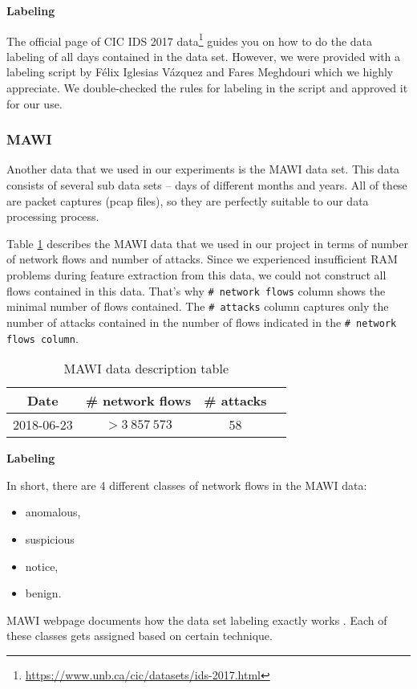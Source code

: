 \documentclass{article}
\begin{document}
\clearpage
\noindent\textbf{Labeling}

The official page of CIC IDS 2017 data\footnote{\url{https://www.unb.ca/cic/datasets/ids-2017.html}} guides you on how to do the data labeling of all days contained in the data set. However, we were provided with a labeling script by Félix Iglesias Vázquez and Fares Meghdouri which we highly appreciate. We double-checked the rules for labeling in the script and approved it for our use.


\subsubsection{MAWI}
Another data that we used in our experiments is the MAWI data set. This data consists of several sub data sets -- days of different months and years. All of these are packet captures (pcap files), so they are perfectly suitable to our data processing process.

Table \ref{tab:mawi-data-description} describes the MAWI data that we used in our project in terms of number of network flows and number of attacks. Since we experienced insufficient RAM problems during feature extraction from this data, we could not construct all flows contained in this data. That's why \verb|# network flows| column shows the minimal number of flows contained. The \verb|# attacks| column captures only the number of attacks contained in the number of flows indicated in the \verb|# network flows column|.

\begin{table}[h!]
\centering
    \begin{tabular}{ |c|c|c|c| }
        \hline
        Date & \# network flows & \# attacks \\
        \hline
        2018-06-23 & $>3\ 857\ 573$ & 58 \\
        \hline
    \end{tabular}
\caption{MAWI data description table}
\label{tab:mawi-data-description}
\end{table}



\noindent\textbf{Labeling}

In short, there are 4 different classes of network flows in the MAWI data:

\begin{itemize}
    \item anomalous,
    \item suspicious
    \item notice,
    \item benign.
\end{itemize}
MAWI webpage documents how the data set labeling exactly works \cite{mawilab-documentation-labeling}. Each of these classes gets assigned based on certain technique.
\end{document}
